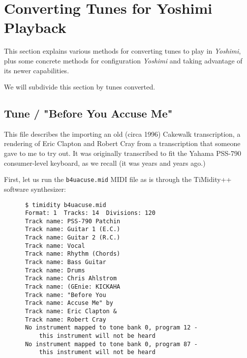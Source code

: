 %
%
%

\section{Converting Tunes for Yoshimi Playback}
\label{sec:conversions}

   This section explains various methods for converting tunes to play in
   \textsl{Yoshimi}, plus some concrete methods for configuration
   \textsl{Yoshimi} and taking advantage of its newer capabilities.

   We will subdivide this section by tunes converted.

\subsection{Tune / "Before You Accuse Me"}
\label{subsec:conversions_tune_b4uacuse}

   This file describes the importing an old (circa 1996)
   Cakewalk transcription, a rendering of Eric Clapton and Robert Cray from a
   transcription that someone gave to me to try out.  It was originally
   transcribed to fit the Yahama PSS-790 \cite{pss790} 
   consumer-level keyboard, as we recall (it was years and years ago.)

   First, let us run the \texttt{b4uacuse.mid} MIDI file
   as is through the TiMidity++ \cite{timidity} software synthesizer:

   \begin{verbatim}
      $ timidity b4uacuse.mid 
      Format: 1  Tracks: 14  Divisions: 120
      Track name: PSS-790 Patchin
      Track name: Guitar 1 (E.C.)
      Track name: Guitar 2 (R.C.)
      Track name: Vocal
      Track name: Rhythm (Chords)
      Track name: Bass Guitar
      Track name: Drums
      Track name: Chris Ahlstrom
      Track name: (GEnie: KICKAHA
      Track name: "Before You
      Track name: Accuse Me" by
      Track name: Eric Clapton &
      Track name: Robert Cray
      No instrument mapped to tone bank 0, program 12 -
          this instrument will not be heard
      No instrument mapped to tone bank 0, program 87 -
          this instrument will not be heard
   \end{verbatim}

